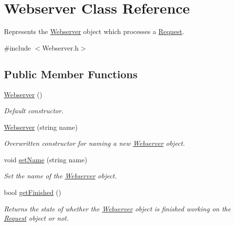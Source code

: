 \hypertarget{classWebserver}{}\section{Webserver Class Reference}
\label{classWebserver}


Represents the \hyperlink{classWebserver}{Webserver} object which processes a \hyperlink{classRequest}{Request}.  




{\ttfamily \#include $<$Webserver.\+h$>$}

\subsection*{Public Member Functions}
\begin{DoxyCompactItemize}
\item 
\mbox{\label{classWebserver_ac2a6f51bcc54efaaf5f4773a7c24f009}} 
\hyperlink{classWebserver_ac2a6f51bcc54efaaf5f4773a7c24f009}{Webserver} ()
\begin{DoxyCompactList}\small\item\em Default constructor. \end{DoxyCompactList}\item 
\hyperlink{classWebserver_ac66530e2c75f4489f3fd0a37d1265a21}{Webserver} (string name)
\begin{DoxyCompactList}\small\item\em Overwritten constructor for naming a new \hyperlink{classWebserver}{Webserver} object. \end{DoxyCompactList}\item 
void \hyperlink{classWebserver_aa4a2355e2a69cd811173efe85b158525}{set\+Name} (string name)
\begin{DoxyCompactList}\small\item\em Set the name of the \hyperlink{classWebserver}{Webserver} object. \end{DoxyCompactList}\item 
bool \hyperlink{classWebserver_a2244e2e2e5f992498a17b5caa90af73b}{get\+Finished} ()
\begin{DoxyCompactList}\small\item\em Returns the state of whether the \hyperlink{classWebserver}{Webserver} object is finished working on the \hyperlink{classRequest}{Request} object or not. \end{DoxyCompactList}\item 

\end{DoxyCompactItemize}
